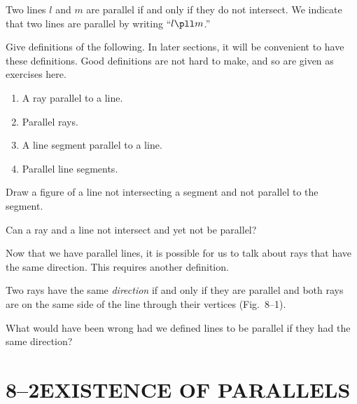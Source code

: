 \documentclass[11pt]{book}
\theoremstyle{bkplain}
\theoremstyle{XIplainnote}
\theoremstyle{bkplain}
\theoremstyle{bkplain}
\begin{document}
\begin{definition}
Two lines $l$ and $m$ are parallel if and only if they do not intersect. We
indicate that two lines are parallel by writing ``$l \pll m$.''
\end{definition}

\begin{exercisecols}
\begin{exlist}
\item Give definitions of the following. In later sections, it will be
  convenient to have these definitions. Good definitions are not hard to make,
  and so are given as exercises here.
  \begin{enumerate}[label=(\alph*), leftmargin=1.8em, topsep=2pt, itemsep=1pt]
    \item A ray parallel to a line.
    \item Parallel rays.
    \item A line segment parallel to a line.
    \item Parallel line segments.
  \end{enumerate}
\item Draw a figure of a line not intersecting a segment and not parallel to
  the segment.
\item Can a ray and a line not intersect and yet not be parallel?
\end{exlist}
\end{exercisecols}

Now that we have parallel lines, it is possible for us to talk about rays that
have the same direction. This requires another definition.

\begin{definition}
Two rays have the same \emph{direction} if and only if they are parallel and
both rays are on the same side of the line through their vertices
(Fig.~8--1).
\end{definition}

\FIGVIIIONE

\noindent What would have been wrong had we defined lines to be parallel if
they had the same direction?

\section*{8--2\quad EXISTENCE OF PARALLELS}
\end{document}
